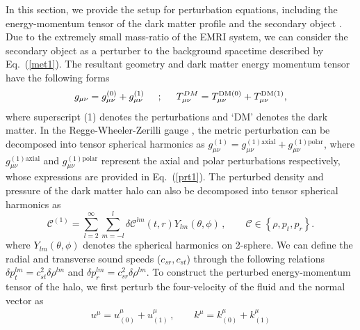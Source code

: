 \documentclass[11pt]{article}
\begin{document}
In this section, we provide the setup for perturbation equations, including the energy-momentum tensor of the dark matter profile and the secondary object \cite{PhysRevD.67.104017, Cardoso:2022whc}. Due to the extremely small mass-ratio of the EMRI system, we can consider the secondary object as a perturber to the background spacetime described by Eq.~(\ref{met1}). 
The resultant geometry and dark matter energy momentum tensor have the following forms
\begin{align}\label{perturbation}
    g_{\mu\nu} = g_{\mu\nu}^{(0)} + g_{\mu\nu}^{(1)} \hspace{5mm} ; \hspace{5mm} T^{DM}_{\mu\nu} = T^{\textrm{DM}(0)}_{\mu\nu} + T^{\textrm{DM}(1)}_{\mu\nu},
\end{align}
where superscript (1) denotes the perturbations and `DM' denotes the dark matter. In the Regge-Wheeler-Zerilli gauge  \cite{PhysRevLett.24.737, PhysRevD.2.2141}, the metric perturbation can be decomposed into tensor spherical harmonics as $g_{\mu\nu}^{(1)} = g_{\mu\nu}^{(1) \textrm{axial}}+g_{\mu\nu}^{(1) \textrm{polar}}$, where $g_{\mu\nu}^{(1) \textrm{axial}}$ and  $g_{\mu\nu}^{(1) \textrm{polar}}$ represent the axial and polar perturbations respectively, whose expressions are provided in Eq.~(\ref{prt1}).
 The perturbed density and pressure of the dark matter halo can also be decomposed into tensor spherical harmonics as 
\begin{equation}\label{delta_rho_pt}
\mathcal{C}^{(1)} = \sum_{l=2}^{\infty}\sum_{m=-l}^{l} \delta \mathcal{C}^{lm}(t,r) Y_{lm}(\theta, \phi)\,,\qquad \mathcal{C}\in\left\{\rho, p_{t}, p_{r}\right\} .
\end{equation}
where $Y_{lm}(\theta, \phi)$ denotes the spherical harmonics on 2-sphere.
We can define the radial and transverse sound speeds ($c_{sr}, c_{st}$) through the following relations $\delta p^{lm}_{t} = c^{2}_{st} \delta\rho^{lm}$ and $\delta p^{lm}_{r} = c^{2}_{sr} \delta\rho^{lm}$. To construct the perturbed energy-momentum tensor of the halo, we first perturb the four-velocity of the fluid and the normal vector as  
\begin{equation}
\begin{aligned}
u^{\mu}=u^{\mu}_{(0)}+u^{\mu}_{(1)}\,,\qquad k^{\mu}=k^{\mu}_{(0)}+k^{\mu}_{(1)}
\end{aligned}
\end{equation}
\end{document}
